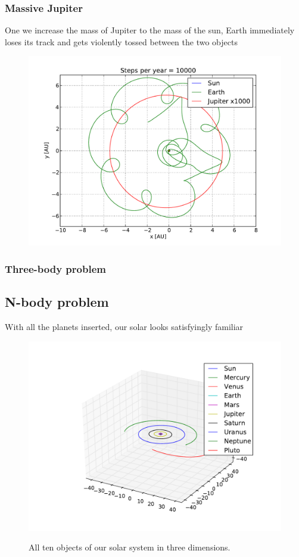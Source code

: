 \documentclass[10pt]{article}
\begin{document}
\begin{multicols}{2}
\subsubsection{Massive Jupiter}
One we increase the mass of Jupiter to the mass of the sun, Earth
immediately loses its track and gets violently tossed between the two
objects
\begin{figure}[H]
    \centering
    \includegraphics[width=1.0\linewidth]{../results/EJSx1000_1.pdf}
    \label{fig:name}
    \caption{}
\end{figure}

\subsubsection{Three-body problem}


\subsection{N-body problem}
With all the planets inserted, our solar looks satisfyingly familiar

\begin{figure}[H]
    \centering
    \includegraphics[width=1.0\linewidth]{../results/full_system.pdf}
    \label{fig:name}
    \caption{All ten objects of our solar system in three dimensions.}
\end{figure}


\end{multicols}
\end{document}
